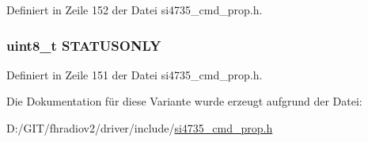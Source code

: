 Definiert in Zeile 152 der Datei si4735\+\_\+cmd\+\_\+prop.\+h.

\hypertarget{unionfm__rds__status__arg1_a696c0636e08a68f420bc7da0ae8aeed1}{}
\subsubsection[{S\+T\+A\+T\+U\+S\+O\+N\+L\+Y}]{\setlength{\rightskip}{0pt plus 5cm}uint8\+\_\+t S\+T\+A\+T\+U\+S\+O\+N\+L\+Y}\label{unionfm__rds__status__arg1_a696c0636e08a68f420bc7da0ae8aeed1}


Definiert in Zeile 151 der Datei si4735\+\_\+cmd\+\_\+prop.\+h.



Die Dokumentation für diese Variante wurde erzeugt aufgrund der Datei\+:\begin{DoxyCompactItemize}
\item 
D\+:/\+G\+I\+T/fhradiov2/driver/include/\hyperlink{si4735__cmd__prop_8h}{si4735\+\_\+cmd\+\_\+prop.\+h}\end{DoxyCompactItemize}
